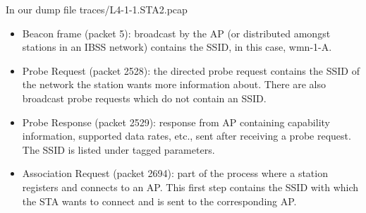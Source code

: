 In our dump file traces/L4-1-1.STA2.pcap
\begin{itemize}
\item Beacon frame (packet 5): broadcast by the AP (or distributed amongst stations in an IBSS network) contains the SSID, in this case, wmn-1-A.
\item Probe Request (packet 2528): the directed probe request contains the SSID of the network the station wants more information about. There are also broadcast probe requests which do not contain an SSID.
\item Probe Response (packet 2529): response from AP containing capability information, supported data rates, etc., sent after receiving a probe request. The SSID is listed under tagged parameters.
\item Association Request (packet 2694): part of the process where a station registers and connects to an AP. This first step contains the SSID with which the STA wants to connect and is sent to the corresponding AP.
\end{itemize}
